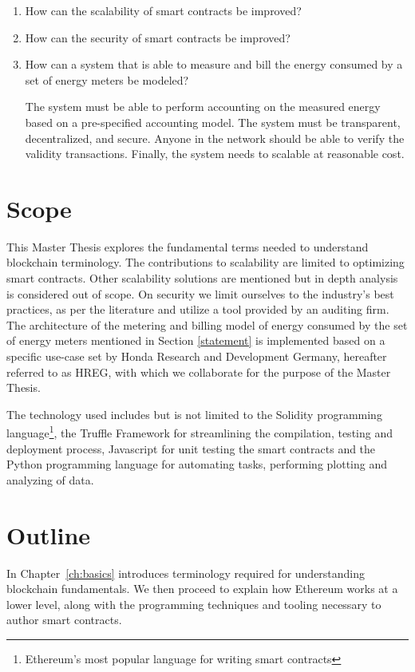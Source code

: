 \begin{enumerate}\label{statement}
    \item How can the scalability of smart contracts be improved?
    \item How can the security of smart contracts be improved?
    \item How can a system that is able to measure and bill the energy consumed by a set of energy meters be modeled? 
    
    The system must be able to perform accounting on the measured energy based on a pre-specified accounting model. The system must be transparent, decentralized, and secure. Anyone in the network should be able to verify the validity transactions. Finally, the system needs to scalable at reasonable cost.
\end{enumerate}

\section{Scope}
This Master Thesis explores the fundamental terms needed to understand blockchain terminology. The contributions to scalability are limited to optimizing smart contracts. Other scalability solutions are mentioned but in depth analysis is considered out of scope. On security we limit ourselves to the industry's best practices, as per the literature and utilize a tool provided by an auditing firm. The architecture of the metering and billing model of energy consumed by the set of energy meters mentioned in Section \ref{statement} is implemented based on a specific use-case set by Honda Research and Development Germany, hereafter referred to as HREG, with which we collaborate for the purpose of the Master Thesis.

The technology used includes but is not limited to the Solidity programming language\footnote{Ethereum's most popular language for writing smart contracts}, the Truffle Framework for streamlining the compilation, testing and deployment process, Javascript for unit testing the smart contracts and the Python programming language for automating tasks, performing plotting and analyzing of data.


\section{Outline}

In Chapter~\ref{ch:basics} introduces terminology required for understanding blockchain fundamentals. We then proceed to explain how Ethereum works at a lower level, along with the programming techniques and tooling necessary to author smart contracts.

